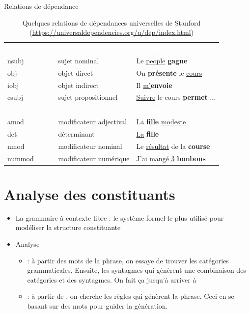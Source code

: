 \documentclass{KodeBook}
\begin{document}
Relations de dépendance
\begin{table}
	\begin{tabular}{p{}p{}p{}}
		\rowcolor{darkblue}
		\textcolor{white}{Dép. de base} & \textcolor{white}{Description} & \textcolor{white}{Exemple}\\
		nsubj & sujet nominal & Le \underline{people} \textbf{gagne}\\
		obj & objet direct & On \textbf{présente} le \underline{cours}\\
		iobj & objet indirect & Il \underline{m'}\textbf{envoie}\\
		csubj & sujet propositionnel & \underline{Suivre} le cours \textbf{permet} ...\\
		
		\rowcolor{darkblue}
		\textcolor{white}{Dép. des noms} & \textcolor{white}{Description} & \textcolor{white}{Exemple}\\
		amod & modificateur adjectival & La \textbf{fille} \underline{modeste}\\
		det & déterminant & \underline{La} \textbf{fille}\\
		nmod & modificateur nominal & Le \underline{résultat} de la \textbf{course}\\
		nummod & modificateur numérique & J'ai mangé \underline{3} \textbf{bonbons}\\
		
	\end{tabular}
	\caption{Quelques relations de dépendances universelles de Stanford \cite{2014-de-marneffe-al} (\url{https://universaldependencies.org/u/dep/index.html})}
\end{table}

\section{Analyse des constituants}

\begin{itemize}
	\item La grammaire à contexte libre : le système formel le plus utilisé pour modéliser la structure constituante
	\item Analyse 
	\begin{itemize}
		\item {} : à partir des mots de la phrase, on essaye de trouver les catégories grammaticales. Ensuite, les syntagmes qui génèrent une combinaison des catégories et des syntagmes. On fait ça jusqu'à arriver à 
		\item {} : à partir de , on cherche les règles qui génèrent la phrase. Ceci en se basant sur des mots pour guider la génération.
	\end{itemize}
\end{itemize}
\end{document}
